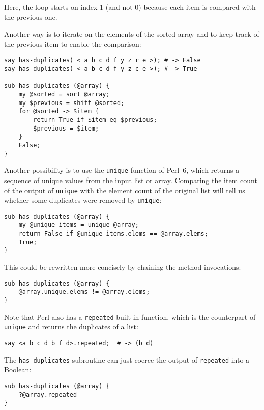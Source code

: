 Here, the loop starts on index 1 (and not 0) because 
each item is compared with the previous one.

Another way is to iterate on the elements of the sorted 
array and to keep track of the previous item to enable 
the comparison:

\begin{verbatim}
say has-duplicates( < a b c d f y z r e >); # -> False
say has-duplicates( < a b c d f y z c e >); # -> True

sub has-duplicates (@array) {
    my @sorted = sort @array;
    my $previous = shift @sorted;
    for @sorted -> $item {
        return True if $item eq $previous;
        $previous = $item;
    }
    False;
}
\end{verbatim}
%

Another possibility is to use the {\tt unique} function 
of Perl~6, which returns a sequence of unique values 
from the input list or array. Comparing the item count 
of the output of {\tt unique} with the element count of 
the original list will tell us whether some duplicates were 
removed by {\tt unique}:

\begin{verbatim}
sub has-duplicates (@array) {
    my @unique-items = unique @array;
    return False if @unique-items.elems == @array.elems;
    True;
}
\end{verbatim}

This could be rewritten more concisely by chaining the 
method invocations:

\begin{verbatim}
sub has-duplicates (@array) {
    @array.unique.elems != @array.elems;
}
\end{verbatim}

Note that Perl also has a {\tt repeated} built-in 
function, which is the counterpart of {\tt unique} 
and returns the duplicates of a list:

\begin{verbatim}
say <a b c d b f d>.repeated;  # -> (b d)
\end{verbatim}

The {\tt has-duplicates} subroutine can just coerce 
the output of {\tt repeated} into a Boolean:
\begin{verbatim}
sub has-duplicates (@array) {
    ?@array.repeated
}
\end{verbatim}


